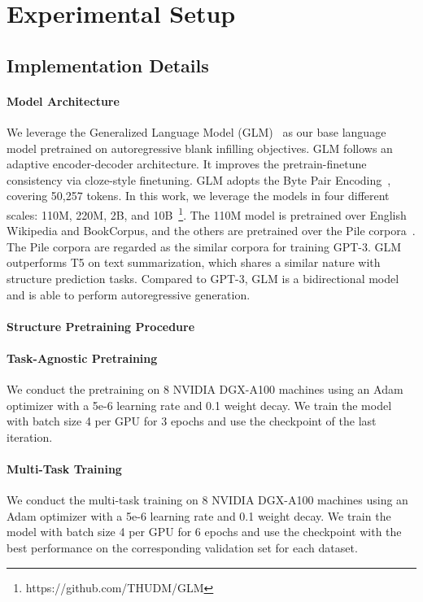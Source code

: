 \section{Experimental Setup}
\label{appendix:exp}
\subsection{Implementation Details} 
\label{sec:implementation}

\paragraph{Model Architecture}
We leverage the Generalized Language Model (GLM)~\cite{du2021all} as our base language model pretrained on autoregressive blank infilling objectives. GLM follows an adaptive encoder-decoder architecture. It improves the pretrain-finetune consistency via cloze-style finetuning. GLM adopts the Byte Pair Encoding~\cite{radford2019language}, covering 50,257 tokens. In this work, we leverage the models in four different scales: 110M, 220M, 2B, and 10B~\footnote{https://github.com/THUDM/GLM}. The 110M model is pretrained over English Wikipedia and BookCorpus, and the others are pretrained over the Pile corpora~\cite{pile}. The Pile corpora are regarded as the similar corpora for training GPT-3. GLM outperforms T5 on text summarization, which shares a similar nature with structure prediction tasks. Compared to GPT-3, GLM is a bidirectional model and is able to perform autoregressive generation.

\paragraph{Structure Pretraining Procedure} 
\paragraph{Task-Agnostic Pretraining} We conduct the pretraining on 8 NVIDIA DGX-A100 machines using an Adam optimizer with a 5e-6 learning rate and 0.1 weight decay. We train the model with batch size 4 per GPU for 3 epochs and use the checkpoint of the last iteration.

\paragraph{Multi-Task Training} We conduct the multi-task training on 8 NVIDIA DGX-A100 machines using an Adam optimizer with a 5e-6 learning rate and 0.1 weight decay. We train the model with batch size 4 per GPU for 6 epochs and use the checkpoint with the best performance on the corresponding validation set for each dataset.

